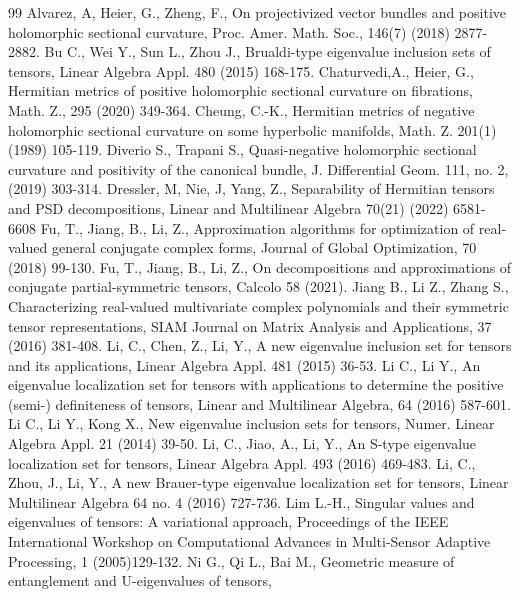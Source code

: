 \documentclass[10pt,reqno]{amsart}
\theoremstyle{definition}
\begin{document}
\begin{thebibliography}{99}
 Alvarez, A, Heier, G., Zheng, F., On projectivized vector bundles and positive holomorphic sectional curvature, Proc. Amer. Math. Soc., 146(7) (2018) 2877-2882.
 Bu C., Wei Y., Sun L., Zhou J., Brualdi-type eigenvalue inclusion sets of tensors, Linear Algebra Appl. 480 (2015) 168-175.
 Chaturvedi,A., Heier, G., Hermitian metrics of positive holomorphic sectional curvature on fibrations, Math. Z., 295 (2020) 349-364. 
 Cheung, C.-K., Hermitian metrics of negative holomorphic sectional curvature on some hyperbolic manifolds,
Math. Z. 201(1) (1989) 105-119.
 Diverio S., Trapani S., Quasi-negative holomorphic sectional curvature and positivity of the
canonical bundle, J. Differential Geom. 111, no. 2, (2019) 303-314.
 Dressler, M, Nie, J, Yang, Z., Separability of Hermitian tensors and PSD decompositions, Linear and Multilinear Algebra 70(21) (2022) 6581-6608
 Fu, T., Jiang, B., Li, Z., Approximation algorithms for optimization of real-valued general
conjugate complex forms, Journal of Global Optimization, 70 (2018) 99-130.
 Fu, T., Jiang, B., Li, Z., On decompositions and approximations of conjugate partial-symmetric tensors, Calcolo 58 (2021).
 Jiang B., Li Z., Zhang S., Characterizing real-valued multivariate complex polynomials and
their symmetric tensor representations, SIAM Journal on Matrix Analysis and Applications,
37 (2016) 381-408.
  Li, C., Chen, Z., Li, Y., A new eigenvalue inclusion set for tensors and its applications, Linear Algebra Appl. 481 (2015) 36-53.
 Li C., Li Y., An eigenvalue localization set for tensors with applications
to determine the positive (semi-) definiteness of tensors, Linear and Multilinear Algebra, 64 (2016) 587-601.
 Li C., Li Y., Kong X., New eigenvalue inclusion sets for tensors, Numer. Linear Algebra Appl. 21 (2014) 39-50.
  Li, C., Jiao, A., Li, Y., An S-type eigenvalue localization set for tensors, Linear Algebra Appl. 493 (2016) 469-483.
 Li, C., Zhou, J., Li, Y.,
A new Brauer-type eigenvalue localization set for tensors,
Linear Multilinear Algebra 64  no. 4 (2016) 727-736.
 Lim L.-H., Singular values and eigenvalues of tensors: A variational approach, Proceedings
of the IEEE International Workshop on Computational Advances in Multi-Sensor Adaptive
Processing, 1 (2005)129-132.
 Ni G., Qi L., Bai M., Geometric measure of entanglement and U-eigenvalues of tensors,

\end{thebibliography}
\end{document}
